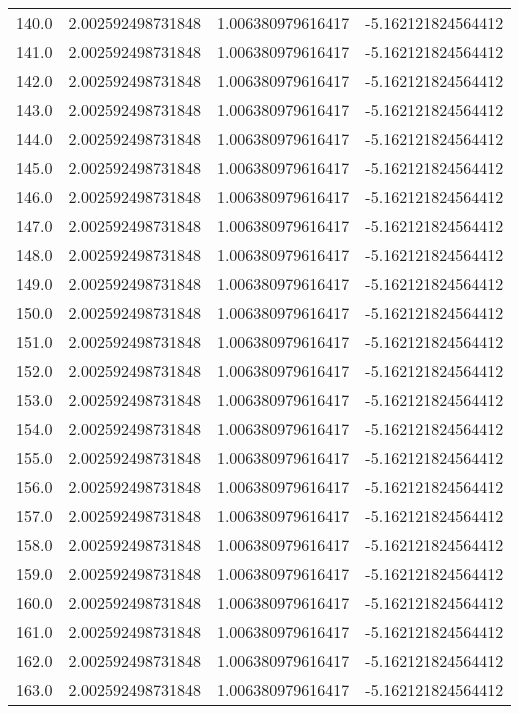 \begin{longtable}{lrrr}
140.0 & 2.002592498731848 & 1.006380979616417 & -5.162121824564412 \\
141.0 & 2.002592498731848 & 1.006380979616417 & -5.162121824564412 \\
142.0 & 2.002592498731848 & 1.006380979616417 & -5.162121824564412 \\
143.0 & 2.002592498731848 & 1.006380979616417 & -5.162121824564412 \\
144.0 & 2.002592498731848 & 1.006380979616417 & -5.162121824564412 \\
145.0 & 2.002592498731848 & 1.006380979616417 & -5.162121824564412 \\
146.0 & 2.002592498731848 & 1.006380979616417 & -5.162121824564412 \\
147.0 & 2.002592498731848 & 1.006380979616417 & -5.162121824564412 \\
148.0 & 2.002592498731848 & 1.006380979616417 & -5.162121824564412 \\
149.0 & 2.002592498731848 & 1.006380979616417 & -5.162121824564412 \\
150.0 & 2.002592498731848 & 1.006380979616417 & -5.162121824564412 \\
151.0 & 2.002592498731848 & 1.006380979616417 & -5.162121824564412 \\
152.0 & 2.002592498731848 & 1.006380979616417 & -5.162121824564412 \\
153.0 & 2.002592498731848 & 1.006380979616417 & -5.162121824564412 \\
154.0 & 2.002592498731848 & 1.006380979616417 & -5.162121824564412 \\
155.0 & 2.002592498731848 & 1.006380979616417 & -5.162121824564412 \\
156.0 & 2.002592498731848 & 1.006380979616417 & -5.162121824564412 \\
157.0 & 2.002592498731848 & 1.006380979616417 & -5.162121824564412 \\
158.0 & 2.002592498731848 & 1.006380979616417 & -5.162121824564412 \\
159.0 & 2.002592498731848 & 1.006380979616417 & -5.162121824564412 \\
160.0 & 2.002592498731848 & 1.006380979616417 & -5.162121824564412 \\
161.0 & 2.002592498731848 & 1.006380979616417 & -5.162121824564412 \\
162.0 & 2.002592498731848 & 1.006380979616417 & -5.162121824564412 \\
163.0 & 2.002592498731848 & 1.006380979616417 & -5.162121824564412 \\

\end{longtable}
